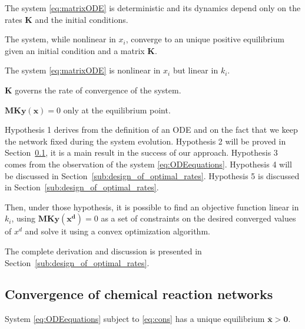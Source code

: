		\begin{my_enumerate}
			\item The system \eqref{eq:matrixODE} is deterministic and its dynamics depend only on the rates $\mathbf{K}$ and the initial conditions.
			\item The system, while nonlinear in $x_i$, converge to an unique positive equilibrium given an initial condition and a matrix $\mathbf{K}$.
			\item The system \eqref{eq:matrixODE} is nonlinear in $x_i$ but linear in $k_i$.
			\item $\mathbf{K}$ governs the rate of convergence of the system.
			\item $\mathbf{M}\mathbf{K}\mathbf{y}(\mathbf{x}) = 0$ only at the equilibrium point.
		\end{my_enumerate}
		
		Hypothesis 1 derives from the definition of an ODE and on the fact that we keep the network fixed during the system evolution. Hypothesis 2 will be proved in Section~\ref{sub:convergence_of_chemical_reaction_networks}, it is a main result in the success of our approach. Hypothesis 3 comes from the observation of the system \eqref{eq:ODEequations}. Hypothesis 4 will be discussed in Section~\ref{sub:design_of_optimal_rates}. Hypothesis 5 is discussed in Section~\ref{sub:design_of_optimal_rates}.
		
		Then, under those hypothesis, it is possible to find an objective function linear in $k_i$, using $\mathbf{M}\mathbf{K}\mathbf{y}(\mathbf{x^d}) = 0$ as a set of constraints on the desired converged values of $x^d$ and solve it using a convex optimization algorithm.
		
		The complete derivation and discussion is presented in Section~\ref{sub:design_of_optimal_rates}.
		

	\subsection{Convergence of chemical reaction networks} %
	\label{sub:convergence_of_chemical_reaction_networks}
		
		\begin{theorem}\label{thm:unique_equilibrium}
		System \eqref{eq:ODEequations} subject to \eqref{eq:cons} has a
		unique equilibrium $\mathbf{\bar{x}} > \mathbf{0}$.
		\end{theorem}
		
